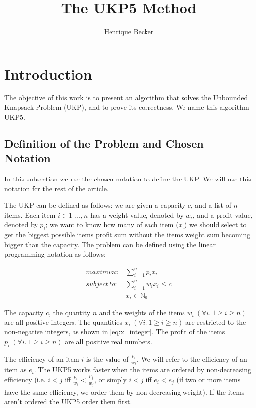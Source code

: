 \documentclass[12pt]{article}
\title{The UKP5 Method}
\author{Henrique Becker\inst{1}}
\begin{document}
 

\maketitle

\section{Introduction}

The objective of this work is to present an algorithm that solves the Unbounded Knapsack Problem (UKP), and to prove its correctness. We name this algorithm UKP5.

\subsection{Definition of the Problem and Chosen Notation}

In this subsection we use the chosen notation to define the UKP. We will use this notation for the rest of the article.

The UKP can be defined as follows: we are given a capacity \(c\), and a list of \(n\) items. Each item \(i \in {1, \ldots, n}\) has a weight value, denoted by \(w_i\), and a profit value, denoted by \(p_i\); we want to know how many of each item (\(x_i\)) we should select to get the biggest possible items profit sum without the items weight sum becoming bigger than the capacity. The problem can be defined using the linear programming notation as follows:

\begin{align}
  maximize: &\sum_{i=1}^n p_i x_i\label{eq:objfun}\\
subject~to: &\sum_{i=1}^n w_i x_i \leq c\label{eq:capcons}\\
            &x_i \in \mathbb{N}_0\label{eq:x_integer}
\end{align}

The capacity \(c\), the quantity \(n\) and the weights of the items \(w_i~(\forall i.~1 \geq i \geq n)\) are all positive integers. The quantities \(x_i~(\forall i.~1 \geq i \geq n)\) are restricted to the non-negative integers, as shown in \eqref{eq:x_integer}. The profit of the items \(p_i~(\forall i.~1 \geq i \geq n)\) are all positive real numbers.

The efficiency of an item \(i\) is the value of \(\frac{p_i}{w_i}\). We will refer to the efficiency of an item as \(e_i\). The UKP5 works faster when the items are ordered by non-decreasing efficiency (i.e. \(i < j\) iff \(\frac{p_i}{w_i} < \frac{p_j}{w_j}\), or simply \(i < j\) iff \(e_i < e_j\) (if two or more items have the same efficiency, we order them by non-decreasing weight). If the items aren't ordered the UKP5 order them first.
\end{document}
